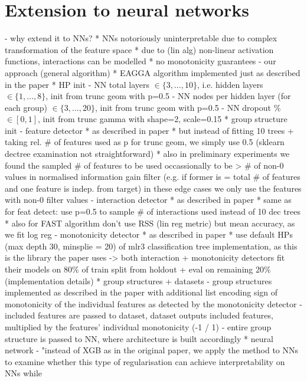 \documentclass[twoside,11pt]{article}
\begin{document}
\section{Extension to neural networks}
- why extend it to NNs?
  * NNs notoriously uninterpretable due to complex transformation of the feature space
  * due to (lin alg) non-linear activation functions, interactions can be modelled
  * no monotonicity guarantees
- our approach
  (general algorithm)
  * EAGGA algorithm implemented just as described in the paper
  * HP init
    - NN total layers $\in\{3, ..., 10\}$, i.e. hidden layers $\in\{1, ..., 8\}$, init from trunc geom with p=0.5
    - NN nodes per hidden layer (for each group) $\in\{3, ..., 20\}$, init from trunc geom with p=0.5
    - NN dropout \% $\in[0, 1]$, init from trunc gamma with shape=2, scale=0.15
  * group structure init
    - feature detector
      * as described in paper
      * but instead of fitting 10 trees + taking rel. \# of features used as p for trunc geom, we simply use 0.5 (sklearn dectree examination not straightforward)
      * also in preliminary experiments we found the sampled \# of features to be used occassionally to be > \# of non-0 values in normalised information gain filter
        (e.g. if former is = total \# of features and one feature is indep. from target) in these edge cases we only use the features with non-0 filter values
    - interaction detector
      * as described in paper
      * same as for feat detect: use p=0.5 to sample \# of interactions used instead of 10 dec trees
      * also for FAST algorithm don't use RSS (lin reg metric) but mean accuracy, as we fit log reg
    - monotonicity detector
      * as described in paper
      * use default HPs (max depth 30, minsplie = 20) of mlr3 classification tree implementation, as this is the library the paper uses
    -> both interaction + monotonicity detectors fit their models on 80\% of train split from holdout + eval on remaining 20\%
  (implementation details)
  * group structures + datasets
    - group structures implemented as described in the paper with additional list encoding sign of monotonicity of the individual features as detected by the
      monotonicity detector
    - included features are passed to dataset, dataset outputs included features, multiplied by the features' individual monotonicity (-1 / 1)
    - entire group structure is passed to NN, where architecture is built accordingly
  * neural network
    - "instead of XGB as in the original paper, we apply the method to NNs to examine whether this type of regularisation can achieve interpretability on NNs while
\end{document}
